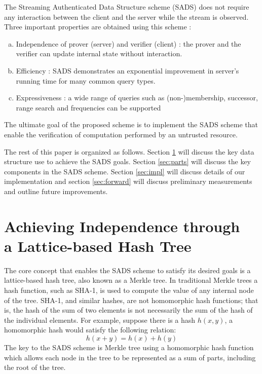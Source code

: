 \documentclass[11pt, letterpaper, oneside]{article}
\begin{document}
	The Streaming Authenticated Data Structure scheme (SADS) \cite{sads} does not require any interaction between the client and the server while the stream is observed.
	Three important properties are obtained using this scheme :
	\begin{enumerate}[a.]
		\item Independence of prover (server) and verifier (client) : the prover and the verifier can update internal state without interaction.
		\item Efficiency : SADS demonstrates an exponential improvement in server's running time for many common query types.
		\item Expressiveness : a wide range of queries such as (non-)membership, successor, range search and frequencies can be supported
	\end{enumerate}
	The ultimate goal of the proposed scheme is to implement the SADS scheme that enable the verification of computation performed by an untrusted resource.

	The rest of this paper is organized as follows.
	Section \ref{sec:tree} will discuss the key data structure use to achieve the SADS goals.
	Section \ref{sec:parts} will discuss the key components in the SADS scheme.
	Section \ref{sec:impl} will discuss details of our implementation and section \ref{sec:forward} will discuss preliminary measurements and outline future improvements.

\section{ Achieving Independence through \\ a Lattice-based Hash Tree }
\label{sec:tree}

	The core concept that enables the SADS scheme to satisfy its desired goals is a lattice-based hash tree, also known as a Merkle tree.
	In traditional Merkle trees a hash function, such as SHA-1, is used to compute the value of any internal node of the tree.
	SHA-1, and similar hashes, are not homomorphic hash functions; that is, the hash of the sum of two elements is not necessarily the sum of the hash of the individual elements.
	For example, suppose there is a hash $h(x, y)$, a homomorphic hash would satisfy the following relation:
	\begin{equation}
		h(x + y) = h(x) + h(y)
	\end{equation}
	The key to the SADS scheme is Merkle tree using a homomorphic hash function which allows each node in the tree to be represented as a sum of parts, including the root of the tree.
\end{document}
